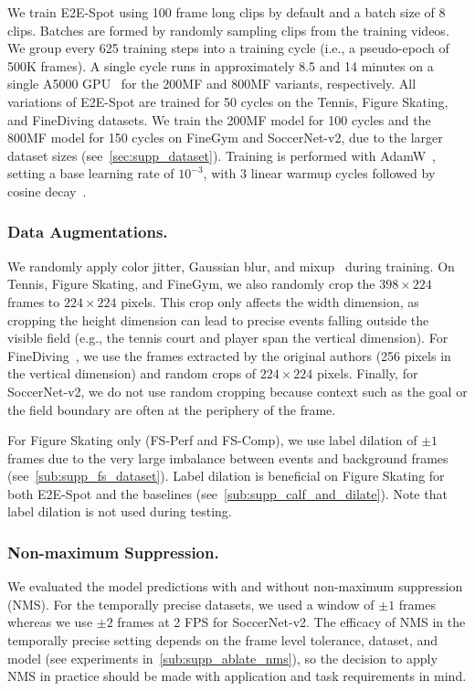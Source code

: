 \documentclass[runningheads]{llncs}
\newcommand{\OURMETHOD}{{E2E-Spot}\xspace}
\newcommand{\fscomp}{{FS-Comp}\xspace}
\newcommand{\fsperf}{{FS-Perf}\xspace}
\newcommand{\finegym}{{FineGym}\xspace}
\newcommand{\finediving}{{FineDiving}\xspace}
\newcommand{\soccernet}{{SoccerNet-v2}\xspace}
\begin{document}
We train \OURMETHOD using 100 frame long clips by default and a batch size of 8 clips.
Batches are formed by randomly sampling clips from the training videos.
We group every 625 training steps into a training cycle (i.e., a pseudo-epoch of 500K frames).
A single cycle runs in approximately 8.5 and 14 minutes on a single A5000 GPU~\cite{rtxa5000} for the 200MF and 800MF variants, respectively.
All variations of \OURMETHOD are trained for 50 cycles on the Tennis, Figure Skating, and \finediving datasets.
We train the 200MF model for 100 cycles and the 800MF model for 150 cycles on \finegym and \soccernet, due to the larger dataset sizes (see~\autoref{sec:supp_dataset}).
Training is performed with AdamW~\cite{adamw}, setting a base learning rate of $10^{-3}$, with 3 linear warmup cycles followed by cosine decay~\cite{cosinelr}.

\subsubsection*{Data Augmentations.}
We randomly apply color jitter, Gaussian blur, and mixup~\cite{mixup} during training.
On Tennis, Figure Skating, and \finegym, we also randomly crop the $398\times224$ frames to $224\times224$ pixels.
This crop only affects the width dimension, as cropping the height dimension can lead to precise events falling outside the visible field (e.g., the tennis court and player span the vertical dimension).
For \finediving~\cite{finediving}, we use the frames extracted by the original authors (256 pixels in the vertical dimension) and random crops of $224\times224$ pixels.
Finally, for \soccernet, we do not use random cropping because context such as the goal or the field boundary are often at the periphery of the frame.

For Figure Skating only (\fsperf and \fscomp), we use label dilation of $\pm1$ frames due to the very large imbalance between events and background frames (see~\autoref{sub:supp_fs_dataset}).
Label dilation is beneficial on Figure Skating for both \OURMETHOD and the baselines (see~\autoref{sub:supp_calf_and_dilate}).
Note that label dilation is not used during testing.

\subsubsection*{Non-maximum Suppression.}
We evaluated the model predictions with and without non-maximum suppression (NMS).
For the temporally precise datasets, we used a window of $\pm1$ frames whereas we use $\pm2$ frames at 2 FPS for \soccernet.
The efficacy of NMS in the temporally precise setting depends on the frame level tolerance, dataset, and model (see experiments in~\autoref{sub:supp_ablate_nms}), so the decision to apply NMS in practice should be made with application and task requirements in mind.
\end{document}
